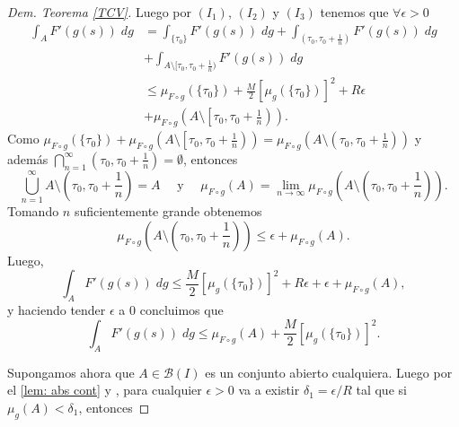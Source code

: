 \begin{proof}[Dem. Teorema \eqref{TCV}]
Luego por $(I_1)$, $(I_2)$ y $(I_3)$ tenemos que $\forall\epsilon>0$ 
\begin{equation*}
\begin{split}
	\int_AF'(g(s))\; dg&=\int_{\{\tau_0\}}F'(g(s))\; dg+\int_{(\tau_0,\tau_0+\frac{1}{n})}F'(g(s))\; dg\\
    &+\int_{A\setminus[\tau_0,\tau_0+\frac{1}{n})}F'(g(s))\; dg\\
	&\leq 	\mu_{F\circ g}(\{\tau_0\})+\frac{M}{2}\left[ \mu_{g}(\{\tau_0\})\right]^2 +R\epsilon\\&+\mu_{F\circ g}\left( A\setminus\left[ \tau_0,\tau_0+\frac{1}{n}\right) \right).
\end{split}
\end{equation*}
Como $\mu_{F\circ g}(\{\tau_0\})+\mu_{F\circ g}\left( A\setminus\left[ \tau_0,\tau_0+\frac{1}{n}\right) \right)=\mu_{F\circ g}\left( A\setminus\left( \tau_0,\tau_0+\frac{1}{n}\right) \right)$ y además $\displaystyle\bigcap_{n=1}^{\infty}\left( \tau_0,\tau_0+\frac{1}{n}\right) =\emptyset$, entonces 
$$\bigcup_{n=1}^{\infty}A\setminus\left( \tau_0,\tau_0+\frac{1}{n}\right) =A \quad\text{ y  } \quad \mu_{F\circ g}(A)=\lim\limits_{n\to \infty}\mu_{F\circ g}\left( A\setminus\left( \tau_0,\tau_0+\frac{1}{n}\right)\right). $$
 Tomando $n$ suficientemente grande obtenemos  
 $$  \mu_{F\circ g}\left( A\setminus\left( \tau_0,\tau_0+\frac{1}{n}\right)\right)\leq \epsilon +\mu_{F\circ g}(A).$$
 Luego, 
 	\begin{equation*}
 	\int_{A} F'(g(s))\; dg
 	\leq \frac{M}{2}\left[ \mu_{g}(\{\tau_0\})\right]^2 +R\epsilon+\epsilon+\mu_{F\circ g}\left( A \right) ,
 \end{equation*}
 y haciendo tender $\epsilon$ a $0$ concluimos que
 \begin{equation}
 		\int_AF'(g(s))\; dg
 	\leq 	\mu_{F\circ g}(A)+\frac{M}{2}\left[ \mu_{g}(\{\tau_0\})\right]^2 .
 \end{equation}
 \label{caso particular}
	




 
Supongamos ahora que  $A\in \mathcal{B}(I)$ es un conjunto abierto cualquiera. Luego por el  \ref{lem: abs cont} y   \cite[Teorema 3.5]{folland}, para cualquier $\epsilon>0$ va a existir $\delta_1=\epsilon/R$ tal que si $\mu_g(A)< \delta_1$, entonces
 



\end{proof}
